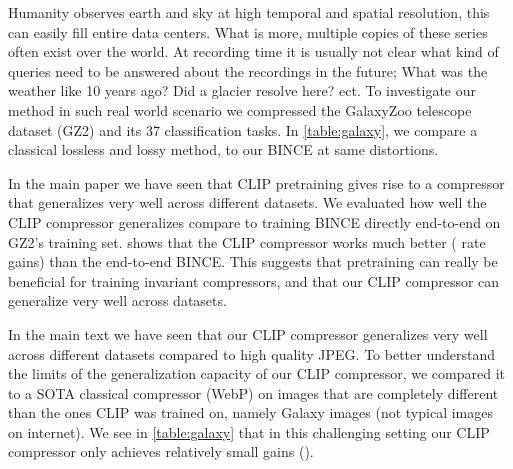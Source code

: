\documentclass[final]{article}
\begin{document}
 
Humanity observes earth and sky at high temporal and spatial resolution, this can easily fill entire data centers. What is more, multiple copies of these series often exist over the world. 
At recording time it is usually not clear what kind of queries need to be answered about the recordings in the future; What was the weather like 10 years ago? Did a glacier resolve here? ect.  
To investigate our method in such real world scenario we compressed the GalaxyZoo telescope dataset (GZ2) and its 37 classification tasks.
In \cref{table:galaxy}, we compare a classical lossless and lossy method, to our BINCE at same distortions.


In the main paper we have seen that CLIP pretraining gives rise to a compressor that generalizes very well across different datasets.
We evaluated how well the CLIP compressor generalizes compare to training BINCE directly end-to-end on GZ2's training set.
 shows that the CLIP compressor works much better ( rate gains) than the end-to-end BINCE.
This suggests that pretraining can really be beneficial for training invariant compressors, and that our CLIP compressor can generalize very well across datasets.


In the main text we have seen that our CLIP compressor generalizes very well across different datasets compared to high quality JPEG.
To better understand the limits of the generalization capacity of our CLIP compressor, we compared it to a SOTA classical compressor (WebP) on images that are completely different than the ones CLIP was trained on, namely Galaxy images (not typical images on internet).
We see in \cref{table:galaxy} that in this challenging setting our CLIP compressor only achieves relatively small gains ().




  
\end{document}
